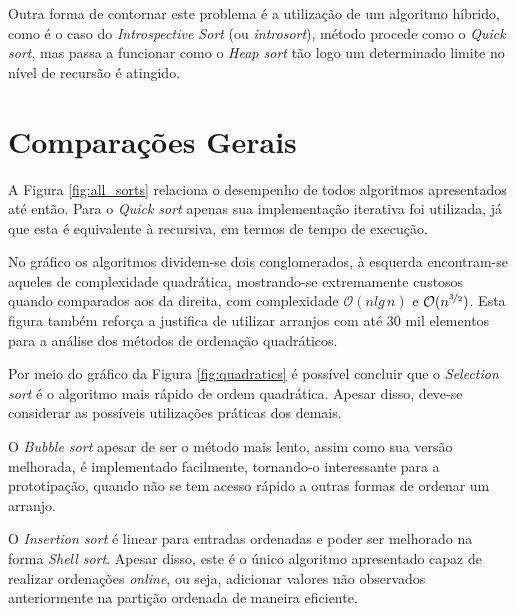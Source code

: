 \documentclass[12pt]{article}
\begin{document}
Outra forma de contornar este problema é a utilização de um algoritmo híbrido, como é o caso do \textit{Introspective Sort} (ou \textit{introsort}), método procede como o \textit{Quick sort}, mas passa a funcionar como o \textit{Heap sort} tão logo um determinado limite no nível de recursão é atingido.
    
\section{Comparações Gerais}

A Figura \ref{fig:all_sorts} relaciona o desempenho de todos algoritmos apresentados até então. Para o \textit{Quick sort} apenas sua implementação iterativa foi utilizada, já que esta é equivalente à recursiva, em termos de tempo de execução.

No gráfico os algoritmos dividem-se dois conglomerados, à esquerda encontram-se aqueles de complexidade quadrática, mostrando-se extremamente custosos quando comparados aos da direita, com complexidade $\mathcal{O}(nlg\,n)$ e $\mathcal{O}(n^{\nicefrac{3}{2}})$. Esta figura também reforça a justifica de utilizar arranjos com até 30 mil elementos para a análise dos métodos de ordenação quadráticos.

Por meio do gráfico da Figura \ref{fig:quadratics} é possível concluir que o \textit{Selection sort} é o algoritmo mais rápido de ordem quadrática. Apesar disso, deve-se considerar as possíveis utilizações práticas dos demais.

O \textit{Bubble sort} apesar de ser o método mais lento, assim como sua versão melhorada, é implementado facilmente, tornando-o interessante para a prototipação, quando não se tem acesso rápido a outras formas de ordenar um arranjo.

O \textit{Insertion sort} é linear para entradas ordenadas e poder ser melhorado na forma \textit{Shell sort}. Apesar disso, este é o único algoritmo apresentado capaz de realizar ordenações \textit{online}, ou seja, adicionar valores não observados anteriormente na partição ordenada de maneira eficiente.
\end{document}
